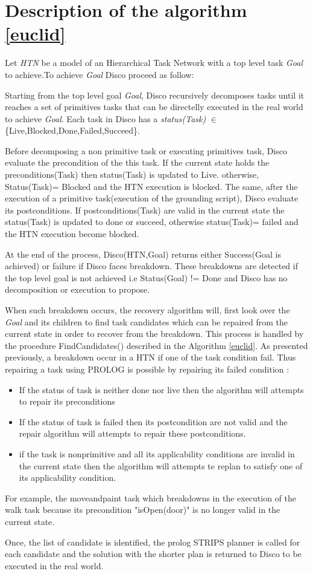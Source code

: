 \section{Description of the algorithm \ref{euclid}}

Let \textit{HTN} be a model of an Hierarchical Task Network with a top level task \textit{Goal} to achieve.To achieve \textit{Goal} Disco proceed as follow:


Starting from the top level goal \textit{Goal}, Disco recursively decomposes tasks until it reaches a set of primitives tasks that can be directelly executed in the real world to achieve \textit{Goal}.
Each task in Disco has a \textit{status(Task)} $\in$ \{Live,Blocked,Done,Failed,Succeed\}.
\par Before decomposing a non primitive task or executing primitives task, Disco evaluate the precondition of the this task. If the current state holds the preconditions(Task) then status(Task) is updated to Live. otherwise, Status(Task)= Blocked and the HTN execution is blocked.
The same, after the execution of a primitive task(execution of the grounding script), Disco evaluate its postconditions. If postconditions(Task) are valid in the current state the status(Task) is updated to done or succeed, otherwise status(Task)= failed and the HTN execution become blocked.


At the end of the process, Disco(HTN,Goal) returns either Success(Goal is achieved) or failure if Disco faces breakdown. These breakdowns are detected if the top level goal is not achieved i.e Status(Goal) != Done and Disco has no decomposition or execution to propose. 

When such breakdown occurs, the recovery algorithm will, first look over the \textit{Goal} and its children to find task candidates which can be repaired from the current state in order to recover from the breakdown. This process is handled by the procedure FindCandidates() described in the Algorithm \ref{euclid}.
As presented previously, a breakdown occur in a HTN if one of the task condition fail. Thus repairing a task using PROLOG is possible by repairing its failed condition :
\begin{itemize}
	\item	If the status of task is neither done nor live then the algorithm will attempts to repair its preconditions
	\item	If the status of task is failed then its postcondition are not valid and the repair algorithm will attempts to repair these postconditions.
	\item	if the task is nonprimitive and all its applicability conditions are invalid in the current state then the algorithm will attempts te replan to satisfy one of its applicability condition. 
\end{itemize}

For example, the moveandpaint task which breakdowns in the execution of the walk task because its precondition "isOpen(door)" is no longer valid in the current state. 

Once, the list of candidate is identified, the prolog STRIPS planner is called for each candidate and the solution with the shorter plan is returned to Disco to be executed in the real world.

